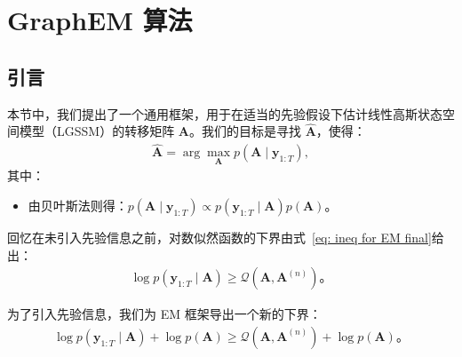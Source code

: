 
\chapter{GraphEM 算法}

\section{引言}

本节中，我们提出了一个通用框架，用于在适当的先验假设下估计线性高斯状态空间模型（LGSSM）的转移矩阵 \(\mathbf{A}\)。我们的目标是寻找 \(\widehat{\mathbf{A}}\)，使得：
\begin{align}
    \widehat{\mathbf{A}} = \arg \max_{\mathbf{A}} p(\mathbf{A} \mid \mathbf{y}_{1:T}), \label{eq: GraphEM argmax}
\end{align}
其中：
\begin{itemize}
    \item 由贝叶斯法则得：\(p(\mathbf{A} \mid \mathbf{y}_{1:T}) \propto p(\mathbf{y}_{1:T} \mid \mathbf{A}) p(\mathbf{A})\)。
\end{itemize}

回忆在未引入先验信息之前，对数似然函数的下界由式~\eqref{eq: ineq for EM final}给出：
\begin{align*}
    \log p(\mathbf{y}_{1:T} \mid \mathbf{A}) \ge \mathcal{Q}(\mathbf{A}, \mathbf{A}^{(n)})。
\end{align*}

为了引入先验信息，我们为 EM 框架导出一个新的下界：
\begin{align}
    \log p(\mathbf{y}_{1:T} \mid \mathbf{A}) + \log p(\mathbf{A}) \ge \mathcal{Q}(\mathbf{A}, \mathbf{A}^{(n)}) + \log p(\mathbf{A})。 \label{eq: ineq for GraphEM}
\end{align}

